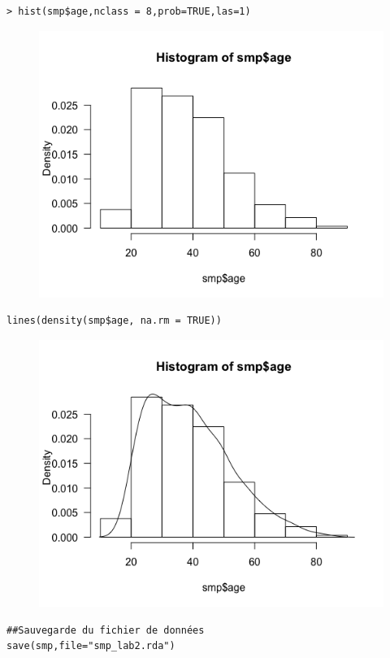 \begin{lstlisting}[language=html]
> hist(smp$age,nclass = 8,prob=TRUE,las=1)
\end{lstlisting}

\begin{figure}[H]\begin{center}\includegraphics[scale=0.45]{ilu/lab2-7.png}\end{center}\end{figure}
\begin{lstlisting}[language=html]
lines(density(smp$age, na.rm = TRUE))
\end{lstlisting}

\begin{figure}[H]\begin{center}\includegraphics[scale=0.45]{ilu/lab2-8.png}\end{center}\end{figure}
\begin{lstlisting}[language=html]
##Sauvegarde du fichier de données
save(smp,file="smp_lab2.rda")
\end{lstlisting}

